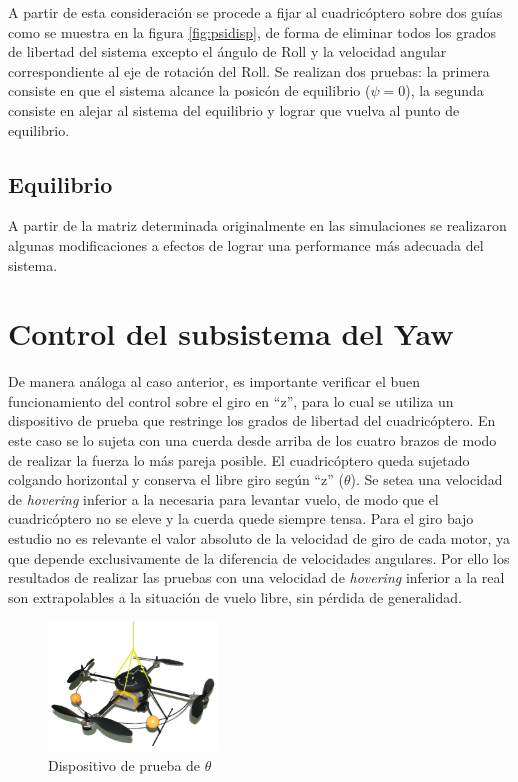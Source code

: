 \documentclass[main]{subfiles}
\begin{document}
A partir de esta consideraci\'on se procede a fijar al cuadric\'optero sobre dos gu\'ias como se muestra en la figura \ref{fig:psidisp}, de forma de eliminar todos los grados de libertad del sistema excepto el \'angulo de Roll y la velocidad angular correspondiente al eje de rotaci\'on del Roll. Se realizan dos pruebas: la primera consiste en que el sistema alcance la posic\'on de equilibrio ($\psi = 0$), la segunda consiste en alejar al sistema del equilibrio y lograr que vuelva al punto de equilibrio. 

\subsection{Equilibrio}
A partir de la matriz determinada originalmente en las simulaciones se realizaron algunas modificaciones a efectos de lograr una performance m\'as adecuada del sistema.


\section{Control del subsistema del Yaw}


De manera an\'aloga al caso anterior, es importante verificar el buen funcionamiento del control sobre el giro en ``z'', para lo cual se utiliza un dispositivo de prueba que restringe los grados de libertad del cuadric\'optero. En este caso se lo sujeta con una cuerda desde arriba de los cuatro brazos de modo de realizar la fuerza lo m\'as pareja posible. El cuadric\'optero queda sujetado colgando horizontal y conserva el libre giro seg\'un ``z'' ($\theta$).
Se setea una velocidad de \emph{hovering} inferior a la necesaria para levantar vuelo, de modo que el cuadric\'optero no se eleve y la cuerda quede siempre tensa. Para el giro bajo estudio no es relevante el valor absoluto de la velocidad de giro de cada motor, ya que depende exclusivamente de la diferencia de velocidades angulares. Por ello los resultados de realizar las pruebas con una velocidad de \emph{hovering} inferior a la real son extrapolables a la situaci\'on de vuelo libre, sin p\'erdida de generalidad.\\

\begin{figure}
	\vspace{-20pt}
	\centering
	\includegraphics[width=0.4\textwidth]{./pics_test_control/dispositivo_theta.pdf}
	\caption{Dispositivo de prueba de $\theta$}
	\label{fig:thetadisp}
\end{figure}
\end{document}
